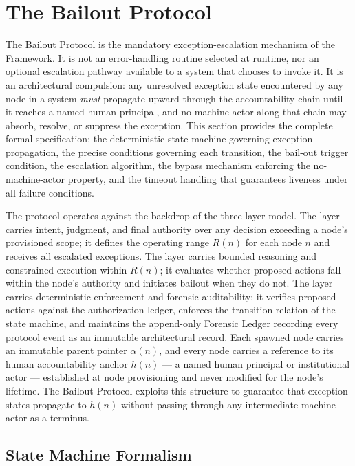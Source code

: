 \section{The Bailout Protocol}\label{sec:bailout}

The Bailout Protocol is the mandatory exception-escalation mechanism of the \bxthree{} Framework. It is not an error-handling routine selected at runtime, nor an optional escalation pathway available to a system that chooses to invoke it. It is an architectural compulsion: any unresolved exception state encountered by any node in a \bxthree{} system \emph{must} propagate upward through the accountability chain until it reaches a named human principal, and no machine actor along that chain may absorb, resolve, or suppress the exception. This section provides the complete formal specification: the deterministic state machine governing exception propagation, the precise conditions governing each transition, the bail-out trigger condition, the escalation algorithm, the bypass mechanism enforcing the no-machine-actor property, and the timeout handling that guarantees liveness under all failure conditions.

The protocol operates against the backdrop of the \bxthree{} three-layer model. The \purpose{} layer carries intent, judgment, and final authority over any decision exceeding a node's provisioned scope; it defines the operating range $R(n)$ for each node $n$ and receives all escalated exceptions. The \bounds{} layer carries bounded reasoning and constrained execution within $R(n)$; it evaluates whether proposed actions fall within the node's authority and initiates bailout when they do not. The \fact{} layer carries deterministic enforcement and forensic auditability; it verifies proposed actions against the authorization ledger, enforces the transition relation of the state machine, and maintains the append-only Forensic Ledger recording every protocol event as an immutable architectural record. Each spawned node carries an immutable parent pointer $\alpha(n)$, and every node carries a reference to its human accountability anchor $h(n)$ --- a named human principal or institutional actor --- established at node provisioning and never modified for the node's lifetime. The Bailout Protocol exploits this structure to guarantee that exception states propagate to $h(n)$ without passing through any intermediate machine actor as a terminus.

\subsection{State Machine Formalism}\label{sec:state-machine}

